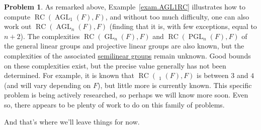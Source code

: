 \documentclass[11pt]{amsart}
\theoremstyle{plain}
\theoremstyle{definition}
\newtheorem*{problem*}{Problem}
\theoremstyle{remark}
\DeclareMathOperator{\GL}{GL}
\DeclareMathOperator{\AGL}{AGL}
\DeclareMathOperator{\PGL}{PGL}
\DeclareMathOperator{\AGammaL}{A\Gamma{}L}
\DeclareMathOperator{\rc}{RC}
\begin{document}
\begin{problem*}
As remarked above, Example~\ref{exam.AGL1RC} illustrates how to compute $\rc(\AGL_1(F),F)$, and without too much difficulty, one can also work out $\rc(\AGL_n(F),F)$ (finding that it is, with few exceptions, equal to $n+2$). The complexities $\rc(\GL_n(F),F)$ and $\rc(\PGL_n(F),F)$ of the general linear groups and projective linear groups are also known, but the complexities of the associated \href{https://en.wikipedia.org/wiki/Semilinear_map#General_semilinear_group}{semilinear groups} remain unknown. Good bounds on these complexities exist, but the precise value generally has not been determined. For example, it is known that $\rc(\AGammaL_1(F),F)$ is between $3$ and $4$ (and will vary depending on $F$), but little more is currently known. This specific problem is being actively researched, so perhaps we will know more soon. Even so, there appears to be plenty of work to do on this family of problems. 
\end{problem*}

And that's where we'll leave things for now. 




\end{document}
